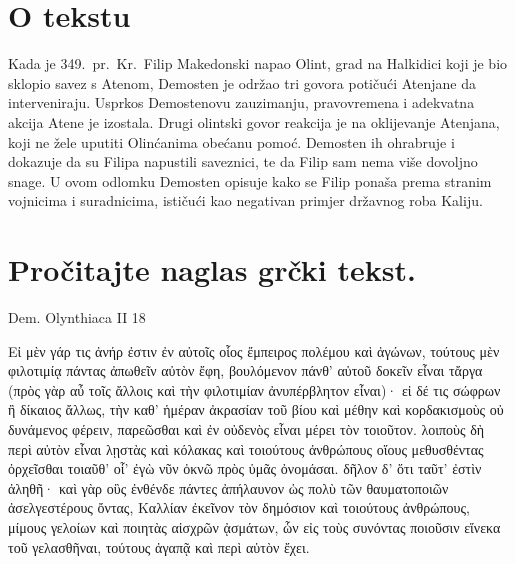 \section*{O tekstu}

Kada je 349.\ pr.~Kr.\ Filip Makedonski napao Olint, grad na Halkidici koji je bio sklopio savez s Atenom, Demosten je održao tri govora potičući Atenjane da interveniraju. Usprkos Demostenovu zauzimanju, pravovremena i adekvatna akcija Atene je izostala. Drugi olintski govor reakcija je na oklijevanje Atenjana, koji ne žele uputiti Olinćanima obećanu pomoć. Demosten ih ohrabruje i dokazuje da su Filipa napustili saveznici, te da Filip sam nema više dovoljno snage. U ovom odlomku Demosten opisuje kako se Filip ponaša prema stranim vojnicima i suradnicima, ističući kao negativan primjer državnog roba Kaliju.


\section*{Pročitajte naglas grčki tekst.}
Dem. Olynthiaca II 18

\medskip

{\large
\begin{greek}
\noindent Εἰ μὲν γάρ τις ἀνήρ ἐστιν ἐν αὐτοῖς οἷος ἔμπειρος πολέμου καὶ ἀγώνων, τούτους μὲν φιλοτιμίᾳ πάντας ἀπωθεῖν αὐτὸν ἔφη, βουλόμενον πάνθ' αὑτοῦ δοκεῖν εἶναι τἄργα (πρὸς γὰρ αὖ τοῖς ἄλλοις καὶ  τὴν φιλοτιμίαν ἀνυπέρβλητον εἶναι)· εἰ δέ τις σώφρων ἢ δίκαιος ἄλλως, τὴν καθ' ἡμέραν ἀκρασίαν τοῦ βίου καὶ μέθην καὶ κορδακισμοὺς οὐ δυνάμενος φέρειν, παρεῶσθαι καὶ ἐν οὐδενὸς εἶναι μέρει τὸν τοιοῦτον. λοιποὺς δὴ περὶ αὐτὸν εἶναι λῃστὰς καὶ κόλακας καὶ τοιούτους ἀνθρώπους οἵους μεθυσθέντας ὀρχεῖσθαι τοιαῦθ' οἷ' ἐγὼ νῦν ὀκνῶ πρὸς ὑμᾶς ὀνομάσαι. δῆλον δ' ὅτι ταῦτ' ἐστὶν ἀληθῆ· καὶ γὰρ οὓς ἐνθένδε πάντες ἀπήλαυνον ὡς πολὺ τῶν θαυματοποιῶν ἀσελγεστέρους ὄντας, Καλλίαν ἐκεῖνον τὸν δημόσιον καὶ τοιούτους ἀνθρώπους, μίμους γελοίων καὶ ποιητὰς αἰσχρῶν ᾀσμάτων, ὧν εἰς τοὺς συνόντας ποιοῦσιν εἵνεκα τοῦ γελασθῆναι, τούτους ἀγαπᾷ καὶ περὶ αὑτὸν ἔχει.

\end{greek}

}

